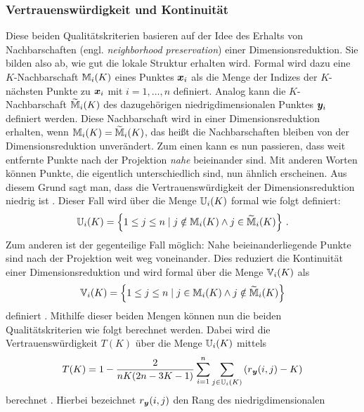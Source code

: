 \subsubsection{Vertrauenswürdigkeit und Kontinuität}
\label{ch:Vergleich:sec:Methodik:subsec:Qualitaetskriterien:TC}
Diese beiden Qualitätskriterien basieren auf der Idee des Erhalts von Nachbarschaften (engl.
\textit{neighborhood preservation}) einer Dimensionsreduktion. Sie bilden also ab, wie gut die
lokale Struktur erhalten wird. Formal wird dazu eine $K$-Nachbarschaft $\mathbb{M}_i(K)$ eines Punktes $\bm{x}_i$ als die Menge der Indizes der $K$-nächsten Punkte zu $\bm{x}_i$ mit $i = 1, \ldots, n$ definiert.
Analog kann die $K$-Nachbarschaft $\widetilde{\mathbb{M}}_i(K)$ des dazugehörigen niedrigdimensionalen
Punktes $\bm{y}_i$ definiert werden. Diese Nachbarschaft wird in einer Dimensionsreduktion
erhalten, wenn $\mathbb{M}_i(K) = \widetilde{\mathbb{M}}_i(K)$, das heißt die Nachbarschaften bleiben von
der Dimensionsreduktion unverändert. Zum einen kann es nun passieren, dass weit entfernte Punkte nach der Projektion \textit{nahe}
beieinander sind. Mit anderen Worten können Punkte, die eigentlich unterschiedlich sind, nun
ähnlich erscheinen. Aus diesem Grund sagt man, dass die Vertrauenswürdigkeit der
Dimensionsreduktion niedrig ist \parencite[486 -- 487]{Venna.2001}. Dieser Fall wird über die Menge $\mathbb{U}_i(K)$ formal wie folgt
definiert:
\begin{equation}
	\mathbb{U}_i(K) =  \left\{ 1 \leq j \leq n \mid j \notin \mathbb{M}_i(K) \land j \in \widetilde{\mathbb{M}}_i(K) \right\} \, .
\end{equation}
Zum anderen ist der gegenteilige Fall möglich: Nahe beieinanderliegende Punkte sind nach der
Projektion weit weg voneinander. Dies reduziert die Kontinuität einer Dimensionsreduktion und wird
formal über die Menge $\mathbb{V}_i(K)$ als
\begin{equation}
	\mathbb{V}_i(K) =  \left\{ 1 \leq j \leq n \mid j \in \mathbb{M}_i(K) \land j \notin \widetilde{\mathbb{M}}_i(K) \right\}
\end{equation}
definiert \parencite[487]{Venna.2001}. Mithilfe dieser beiden Mengen können nun die beiden Qualitätskriterien wie
folgt berechnet werden. Dabei wird die Vertrauenswürdigkeit $T(K)$ über die Menge $\mathbb{U}_i(K)$
mittels
\begin{equation}
	T(K) = 1 - \frac{2}{nK(2n - 3K - 1)} \sum_{i = 1}^{n}\sum_{j \in \set{U}_i(K) } \left( r­_{\vect{y}}(i, j) - K \right)
\end{equation}
berechnet \parencite[487]{Venna.2001}. Hierbei bezeichnet $r_{\bm{y}}(i, j)$ den Rang des niedrigdimensionalen

